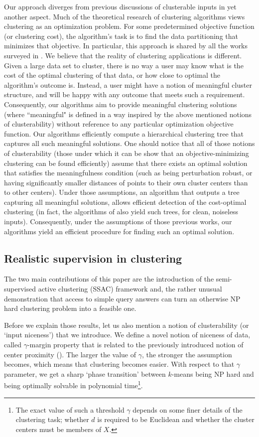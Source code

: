 \documentclass[11pt]{article}
\begin{document}
Our approach diverges from previous discussions of clusterable inputs in yet another aspect. Much of the theoretical research of clustering algorithms views clustering as an optimization problem. For some predetermined objective function (or clustering cost), the algorithm's task is to find the data partitioning that minimizes that objective. In particular, this approach is shared by all the works surveyed in \cite{ben2015computational}. We believe that the reality of clustering applications is different. Given a large data set to cluster, there is no way a user may know what is the cost of the optimal clustering of that data, or how close to optimal the algorithm's outcome is. Instead, a user might have a notion of meaningful cluster structure, and will be happy with any outcome that meets such a requirement. Consequently, our algorithms aim to provide meaningful clustering solutions (where ``meaningful" is defined in a way inspired by the above mentioned notions of clusterability) without reference to any particular optimization objective function. Our algorithms efficiently compute a hierarchical clustering tree that captures all such meaningful solutions. One should notice that all of those notions of clusterability (those under which it can be show that an objective-minimizing clustering can be found efficiently) assume that there exists an optimal solution that satisfies the meaningfulness condition (such as being perturbation robust, or having significantly smaller distances of points to their own cluster centers than to other centers). Under those assumptions, an algorithm that outputs a tree capturing all meaningful solutions, allows efficient detection of the cost-optimal clustering (in fact, the algorithms of \cite{balcan2012clustering} also yield such trees, for clean, noiseless inputs). Consequently, under the assumptions of those previous works, our algorithms yield an efficient procedure for finding such an optimal solution.

\subsection{Realistic supervision in clustering}
The two main contributions of this paper are the introduction of the semi-supervised active clustering (SSAC) framework and, the rather unusual 
demonstration that access to simple query answers can turn an otherwise NP hard clustering problem into a feasible one. 

Before we explain those results, let us also mention a notion of clusterability (or `input niceness') that we introduce. We define a novel notion of niceness of data, called $\gamma$-margin property that is related to the previously introduced notion of center proximity (\cite{awasthi2012center}). The larger the value of $\gamma$, the stronger the assumption becomes, which means that clustering becomes easier. With respect to that $\gamma$ parameter, we get a sharp `phase transition' between $k$-means being NP hard and being optimally solvable in polynomial time\footnote{The exact value of such a threshold $\gamma$ depends on some finer details of the clustering task; whether $d$ is required to be Euclidean and whether the cluster centers must be members of $X$.}.
\end{document}
